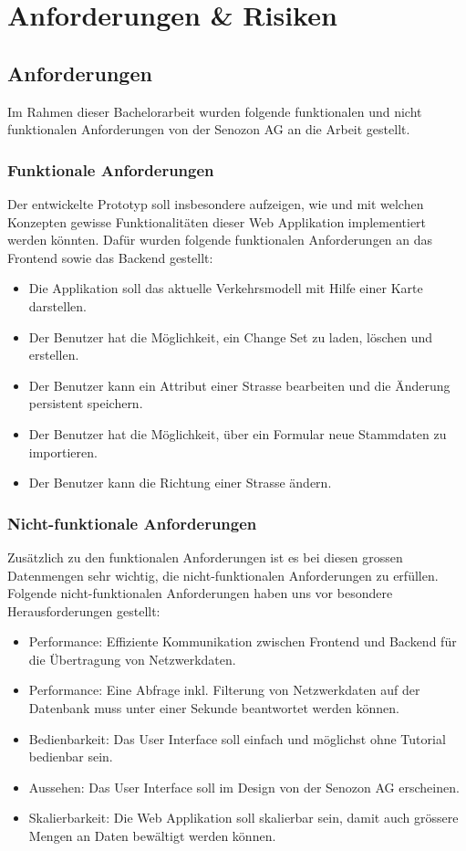 \chapter{Anforderungen \& Risiken} \label{ch:anforderungen_section}
\section{Anforderungen}
Im Rahmen dieser Bachelorarbeit wurden folgende funktionalen und nicht funktionalen Anforderungen von der Senozon AG an die Arbeit gestellt.
\subsection{Funktionale Anforderungen}
Der entwickelte Prototyp soll insbesondere aufzeigen, wie und mit welchen Konzepten gewisse Funktionalitäten dieser Web Applikation implementiert werden könnten. Dafür wurden folgende funktionalen Anforderungen an das Frontend sowie das Backend gestellt:
\begin{itemize}
\item Die Applikation soll das aktuelle Verkehrsmodell mit Hilfe einer Karte darstellen.
\item Der Benutzer hat die Möglichkeit, ein Change Set zu laden, löschen und erstellen.
\item Der Benutzer kann ein Attribut einer Strasse bearbeiten und die Änderung persistent speichern.
\item Der Benutzer hat die Möglichkeit, über ein Formular neue Stammdaten zu importieren.
\item Der Benutzer kann die Richtung einer Strasse ändern.
\end{itemize}
\subsection{Nicht-funktionale Anforderungen}
\label{ch:NFRs}
Zusätzlich zu den funktionalen Anforderungen ist es bei diesen grossen Datenmengen sehr wichtig, die nicht-funktionalen Anforderungen zu erfüllen. Folgende nicht-funktionalen Anforderungen haben uns vor besondere Herausforderungen gestellt:
\begin{itemize}
\item Performance: Effiziente Kommunikation zwischen Frontend und Backend für die Übertragung von Netzwerkdaten.
\item Performance: Eine Abfrage inkl. Filterung von Netzwerkdaten auf der Datenbank muss unter einer Sekunde beantwortet werden können.
\item Bedienbarkeit: Das User Interface soll einfach und möglichst ohne Tutorial bedienbar sein.
\item Aussehen: Das User Interface soll im Design von der Senozon AG erscheinen.
\item Skalierbarkeit: Die Web Applikation soll skalierbar sein, damit auch grössere Mengen an Daten bewältigt werden können.
\end{itemize}
